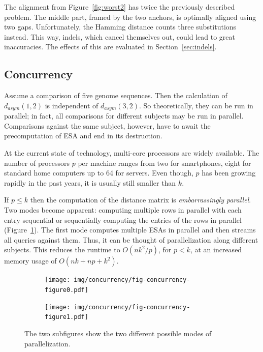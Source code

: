 \documentclass[a4paper,
  10pt,
  english,
  DIV=12,
  BCOR=8mm]{scrbook}
\begin{document}
The alignment from Figure~\ref{fig:worst2} has twice the previously described problem. The middle part, framed by the two anchors, is optimally aligned using two gaps. Unfortunately, the Hamming distance counts three substitutions instead. This way, indels, which cancel themselves out, could lead to great inaccuracies. The effects of this are evaluated in Section~\ref{sec:indels}.


\subsection{Concurrency}\label{sec:concurrency}

Assume a comparison of five genome sequences. Then the calculation of $d_{asym}(1,2)$ is independent of $d_{asym}(3,2)$. So theoretically, they can be run in parallel; in fact, all comparisons for different subjects may be run in parallel. Comparisons against the same subject, however, have to await the precomputation of \ac{ESA} and end in its destruction.

At the current state of technology, multi-core processors are widely available. The number of processors $p$ per machine ranges from two for smartphones, eight for standard home computers up to 64 for servers. Even though, $p$ has been growing rapidly in the past years, it is usually still smaller than $k$.

If $p \le k$ then the computation of the distance matrix is \emph{embarrassingly parallel}. Two modes become apparent: computing multiple rows in parallel with each entry sequential or sequentially computing the entries of the rows in parallel (Figure~\ref{fig:par}). The first mode computes multiple \acp{ESA} in parallel and then streams all queries against them. Thus, it can be thought of parallelization along different subjects. This reduces the runtime to $O(nk^2/p)$, for $p < k$, at an increased memory usage of $O(nk + np + k^2)$.

\begin{figure}
  \centering
  \begin{subfigure}{0.48\textwidth}
    \centering \texttt{[image: img/concurrency/fig-concurrency-figure0.pdf]}
  \end{subfigure}
  \quad
  \begin{subfigure}{0.48\textwidth}
    \centering \texttt{[image: img/concurrency/fig-concurrency-figure1.pdf]}
  \end{subfigure}
  \caption[Concurrency Modes]{\label{fig:par} The two subfigures show the two different possible modes of parallelization.}
\end{figure}
\end{document}
